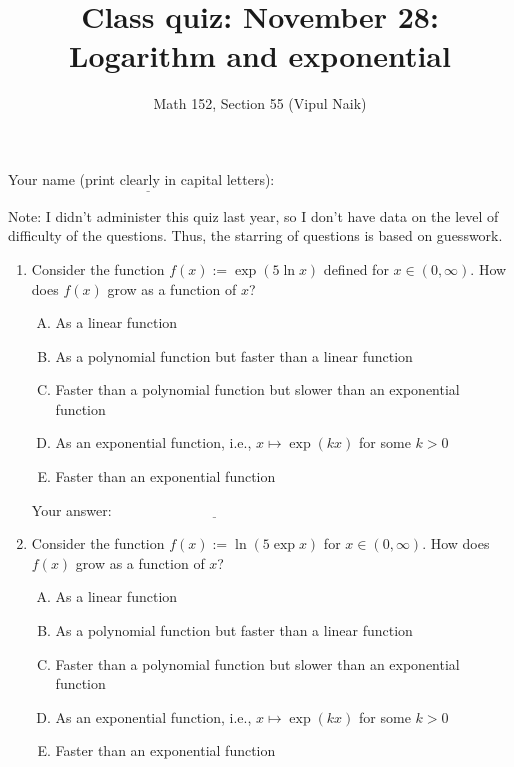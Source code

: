 \documentclass[10pt]{amsart}
\title{Class quiz: November 28: Logarithm and exponential}
\author{Math 152, Section 55 (Vipul Naik)}
\begin{document}
\maketitle

Your name (print clearly in capital letters): $\underline{\qquad\qquad\qquad\qquad\qquad\qquad\qquad\qquad\qquad\qquad}$

Note: I didn't administer this quiz last year, so I don't have data on
the level of difficulty of the questions. Thus, the starring of
questions is based on guesswork.

\begin{enumerate}
\item Consider the function $f(x) := \exp(5 \ln x)$ defined for $x \in
  (0,\infty)$. How does $f(x)$ grow as a function of $x$?

  \begin{enumerate}[(A)]
  \item As a linear function
  \item As a polynomial function but faster than a linear function
  \item Faster than a polynomial function but slower than an
    exponential function
  \item As an exponential function, i.e., $x \mapsto \exp(kx)$ for some $k > 0$
  \item Faster than an exponential function
  \end{enumerate}

  \vspace{0.1in}
  Your answer: $\underline{\qquad\qquad\qquad\qquad\qquad\qquad\qquad}$
  \vspace{0.6in}

\item Consider the function $f(x) := \ln (5 \exp x)$ for $x \in
  (0,\infty)$. How does $f(x)$ grow as a function of $x$?

  \begin{enumerate}[(A)]
  \item As a linear function
  \item As a polynomial function but faster than a linear function
  \item Faster than a polynomial function but slower than an
    exponential function
  \item As an exponential function, i.e., $x \mapsto \exp(kx)$ for some $k > 0$
  \item Faster than an exponential function
  \end{enumerate}


\end{enumerate}
\end{document}
